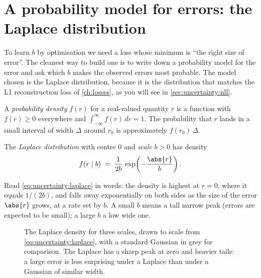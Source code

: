 \section{A probability model for errors: the Laplace distribution}\label{sec:uncertainty:laplace}

To learn $b$ by optimisation we need a loss whose minimum is ``the right size of error''. The cleanest way to
build one is to write down a probability model for the error and ask which $b$ makes the observed errors most
probable. The model chosen is the Laplace distribution, because it is the distribution that matches the L1
reconstruction loss of \cref{ch:losses}, as you will see in \cref{sec:uncertainty:nll}.

\begin{definition}
A \emph{probability density} $f(r)$ for a real-valued quantity $r$ is a function
with $f(r)\ge 0$ everywhere and $\int_{-\infty}^{\infty} f(r)\,dr=1$. The probability that $r$ lands in a
small interval of width $\Delta$ around $r_0$ is approximately $f(r_0)\,\Delta$.
\end{definition}

\begin{definition}
The \emph{Laplace distribution} with centre $0$ and \emph{scale} $b>0$ has density
\begin{equation}\label{eq:uncertainty:laplace}
  f(r\mid b) \;=\; \frac{1}{2b}\,\exp\!\left(-\frac{\abs{r}}{b}\right).
\end{equation}
\end{definition}

Read \cref{eq:uncertainty:laplace} in words: the density is highest at $r=0$, where it equals $1/(2b)$, and
falls away exponentially on both sides as the size of the error $\abs{r}$ grows, at a rate set by $b$. A small
$b$ means a tall narrow peak (errors are expected to be small); a large $b$ a low wide one.

\begin{figure}[htbp]
\centering
{}
\caption{The Laplace density for three scales, drawn to scale from \cref{eq:uncertainty:laplace}, with a
standard Gaussian in grey for comparison. The Laplace has a sharp peak at zero and heavier tails: a large
error is less surprising under a Laplace than under a Gaussian of similar width.}
\label{fig:uncertainty:laplace}
\end{figure}


